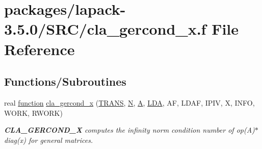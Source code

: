 \hypertarget{cla__gercond__x_8f}{}\section{packages/lapack-\/3.5.0/\+S\+R\+C/cla\+\_\+gercond\+\_\+x.f File Reference}
\label{cla__gercond__x_8f}
\subsection*{Functions/\+Subroutines}
\begin{DoxyCompactItemize}
\item 
real \hyperlink{afunc_8m_a7b5e596df91eadea6c537c0825e894a7}{function} \hyperlink{group__complexGEcomputational_gadb9d40c4c3383a6fc0987f9b356f9044}{cla\+\_\+gercond\+\_\+x} (\hyperlink{superlu__enum__consts_8h_a0c4e17b2d5cea33f9991ccc6a6678d62a1f61e3015bfe0f0c2c3fda4c5a0cdf58}{T\+R\+A\+N\+S}, \hyperlink{polmisc_8c_a0240ac851181b84ac374872dc5434ee4}{N}, \hyperlink{classA}{A}, \hyperlink{example__user_8c_ae946da542ce0db94dced19b2ecefd1aa}{L\+D\+A}, A\+F, L\+D\+A\+F, I\+P\+I\+V, X, I\+N\+F\+O, W\+O\+R\+K, R\+W\+O\+R\+K)
\begin{DoxyCompactList}\small\item\em {\bfseries C\+L\+A\+\_\+\+G\+E\+R\+C\+O\+N\+D\+\_\+\+X} computes the infinity norm condition number of op(\+A)$\ast$diag(x) for general matrices. \end{DoxyCompactList}\end{DoxyCompactItemize}
